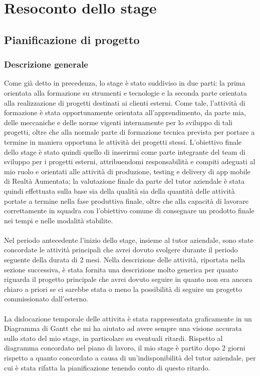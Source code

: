 \section{Resoconto dello stage}
\subsection{Pianificazione di progetto}
\subsubsection{Descrizione generale}
Come gi\`a detto in precedenza, lo stage \`e stato suddiviso in due parti: la prima orientata alla formazione su strumenti e tecnologie e la seconda parte orientata alla realizzazione di progetti destinati ai clienti esterni. Come tale, l’attività di formazione \`e stata opportunamente orientata all’apprendimento, da parte mia, delle meccaniche e delle norme vigenti internamente per lo sviluppo di tali progetti, oltre che alla normale parte di formazione tecnica prevista per portare a termine in maniera opportuna le attività dei progetti stessi.
L’obiettivo finale dello stage \`e stato quindi quello di inserirmi come parte integrante del team di sviluppo per i progetti esterni, attribuendomi responsabilità e compiti adeguati al mio ruolo e orientati alle attività di produzione, testing e delivery di app mobile di Realtà Aumentata; la valutazione finale da parte del tutor aziendale \`e stata quindi effettuata sulla base sia della qualità sia della quantità delle attività portate a termine nella fase produttiva finale, oltre che alla capacità di lavorare correttamente in squadra con l’obiettivo comune di consegnare un prodotto finale nei tempi e nelle modalità stabilite.
\\\\
Nel periodo antecedente l'inizio dello stage, insieme al tutor aziendale, sono state concordate le attivit\`a principali che avrei dovuto svolgere durante il periodo seguente della durata di 2 mesi. Nella descrizione delle attivit\`a, riportata nella sezione successiva, \`e stata fornita una descrizione molto generica per quanto riguarda il progetto principale che avrei dovuto seguire in quanto non era ancora chiaro a priori se ci sarebbe stata o meno la possibilit\`a di seguire un progetto commissionato dall'esterno.
\\\\
La dislocazione temporale delle attivita \`e stata rappresentata graficamente in un Diagramma di Gantt che mi ha aiutato ad avere sempre una visione accurata sullo stato del mio stage, in particolare su eventuali ritardi. Rispetto al diagramma concordato nel piano di lavoro, il mio stage \`e partito dopo 2 giorni rispetto a quanto concordato a causa di un'indisponibilit\`a del tutor aziendale, per cui \`e stata rifatta la pianificazione tenendo conto di questo ritardo.

